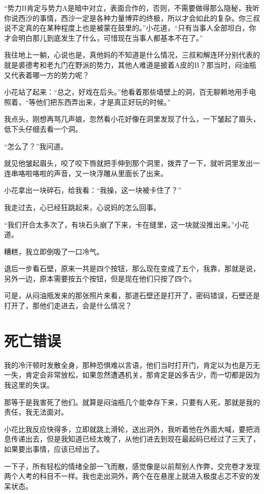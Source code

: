 “势力B肯定与势力A是暗中对立，表面合作的，否则，不需要做得那么隐秘，我听你说西沙的事情，西沙一定是各种力量博弈的终极，所以才会如此的复杂。你三叔说不定真的在某种程度上也是被蒙在鼓里的。”小花道，“只有当事人全部坦白，你才会明白那儿到底发生了什么，可惜现在当事人都基本不在了。”

我往地上一躺，心说也是，真他妈的不知道是什么情况，三叔和解连环分别代表的就是裘德考和老九门在野派的势力，其他人难道是披着A皮的B？那当时，闷油瓶又代表着哪一方的势力呢？

小花站了起来：“总之，好戏在后头。”他看着那些墙壁上的洞，百无聊赖地用手电照着，“等他们把东西弄出来，才是真正好玩的时候。”

我点头，刚想再骂几声娘，忽然看小花好像在洞里发现了什么，一下皱起了眉头，低下头仔细去看一个洞。

“怎么了？”我问道。

就见他皱起眉头，咬了咬下唇就把手伸到那个洞里，拨弄了一下，就听洞里发出一连串咯啦咯啦的声音，又一块浮雕从里面长了出来。

小花拿出一块碎石，给我看：“我操，这一块被卡住了？”

我走过去，心已经狂跳起来，心说妈的怎么回事。

“我们开合太多次了，有块石头崩了下来，卡在缝里，这一块就没推出来。”小花道。

糟糕，我立即倒吸了一口冷气。

退后一步看石壁，原来一共是四个按钮，那么现在变成了五个，我靠，那就是说，另外一边，原本需要按五个按钮，但是现在他们只按了四个。

可是，从闷油瓶发来的那张照片来看，那道石壁还是打开了，密码错误，石壁还是打开了，那他们走进去，会是什么情况？

\chapter{死亡错误}

我的冷汗顿时发散全身，那种恐惧难以言语，他们当时打开门，肯定以为也是万无一失，肯定会非常放松，如果忽然遭遇机关，那肯定是凶多吉少，而一切都是因为我这里的失误。

那等于是我害死了他们。就算是闷油瓶几个能幸存下来，只要有人死，那就是我的责任，我无法面对。

小花比我反应快得多，立即就跳上滑轮，送出洞外，我听着他在外面大喊，要把消息传递出去，但是我知道已经太晚了，从他们进去到现在最起码已经过了三天了，如果要出事情，应该已经出了。

一下子，所有轻松的情绪全部一飞而散，感觉像是以前帮别人作弊，交完卷才发现两个人考的科目不一样。我也走出洞外，两个在在悬崖上就进入极度忐忑不安的发呆状态。

